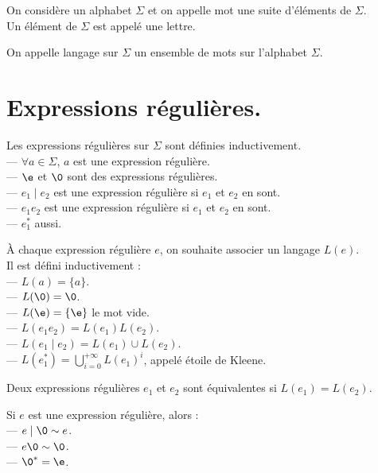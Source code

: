 \documentclass[french, 11pt]{article}
\renewcommand*{\S}{\Sigma}
\begin{document}


\begin{defi}{}{}
    On considère un alphabet $\S$ et on appelle mot une suite d'éléments de $\S$.\\
    Un élément de $\S$ est appelé une lettre. 
\end{defi}

\begin{defi}{}{}
    On appelle langage sur $\S$ un ensemble de mots sur l'alphabet $\S$.
\end{defi}

\section{Expressions régulières.}

\begin{defi}{}{}
    Les expressions régulières sur $\S$ sont définies inductivement.\\
    --- $\forall a \in \S$, $a$ est une expression régulière.\\
    --- $\e$ et $\0$ sont des expressions régulières.\\ 
    --- $e_1\mid e_2$ est une expression régulière si $e_1$ et $e_2$ en sont.\\
    --- $e_1e_2$ est une expression régulière si $e_1$ et $e_2$ en sont.\\
    --- $e_1^*$ aussi.
\end{defi}

\begin{defi}{}{}
    À chaque expression régulière $e$, on souhaite associer un langage $L(e)$.\\
    Il est défini inductivement :\\
    --- $L(a)=\{a\}$.\\
    --- $L(\0)=\0$.\\
    --- $L(\e)=\{\e\}$ le mot vide.\\
    --- $L(e_1e_2)=L(e_1)L(e_2)$.\\
    --- $L(e_1\mid e_2)=L(e_1)\cup L(e_2)$.\\
    --- $L(e_1^*)=\bigcup_{i=0}^{+\infty}L(e_1)^i$, appelé étoile de Kleene.
\end{defi}

\begin{defi}{}{}
    Deux expressions régulières $e_1$ et $e_2$ sont équivalentes si $L(e_1)=L(e_2)$. 
\end{defi}

\begin{ex}{}{}
    Si $e$ est une expression régulière, alors :\\
    --- $e\mid\0\sim e$.\\
    --- $e\0\sim\0$.\\
    --- $\0^*=\e$.
\end{ex}
\end{document}
